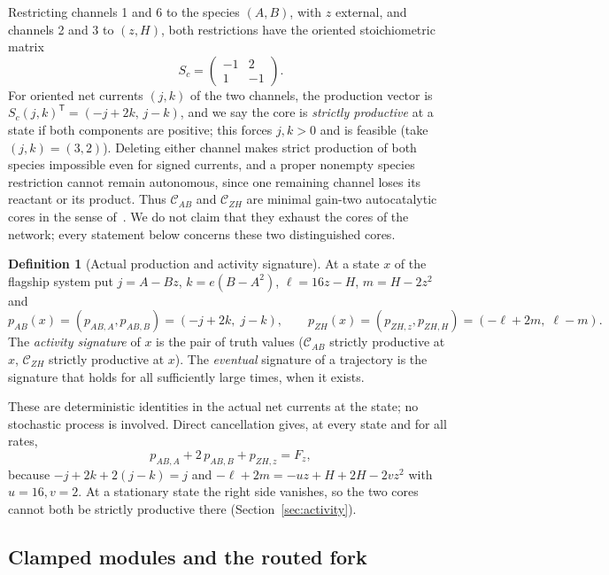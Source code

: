 \documentclass[11pt,a4paper]{article}
\theoremstyle{plain}
\theoremstyle{definition}
\newtheorem{definition}[theorem]{Definition}
\theoremstyle{remark}
\newcommand{\cAB}{\mathcal{C}_{AB}}
\newcommand{\cZH}{\mathcal{C}_{ZH}}
\begin{document}
Restricting channels 1 and 6 to the species $(A,B)$, with $z$ external, and channels 2 and 3 to $(z,H)$, both restrictions have the oriented stoichiometric matrix
\[
S_c=\begin{pmatrix}-1&2\\1&-1\end{pmatrix}.
\]
For oriented net currents $(j,k)$ of the two channels, the production vector is $S_c(j,k)^{\mathsf T}=(-j+2k,\,j-k)$, and we say the core is \emph{strictly productive} at a state if both components are positive; this forces $j,k>0$ and is feasible (take $(j,k)=(3,2)$). Deleting either channel makes strict production of both species impossible even for signed currents, and a proper nonempty species restriction cannot remain autonomous, since one remaining channel loses its reactant or its product. Thus $\cAB$ and $\cZH$ are minimal gain-two autocatalytic cores in the sense of~\cite{blokhuis2020,nandan2026}. We do not claim that they exhaust the cores of the network; every statement below concerns these two distinguished cores.

\begin{definition}[Actual production and activity signature]\label{def:activity}
At a state $x$ of the flagship system put $j=A-Bz$, $k=e(B-A^2)$, $\ell=16z-H$, $m=H-2z^2$ and
\begin{equation}\label{eq:production}
p_{AB}(x)=(p_{AB,A},p_{AB,B})=(-j+2k,\;j-k),\qquad
p_{ZH}(x)=(p_{ZH,z},p_{ZH,H})=(-\ell+2m,\;\ell-m).
\end{equation}
The \emph{activity signature} of $x$ is the pair of truth values ($\cAB$ strictly productive at $x$, $\cZH$ strictly productive at $x$). The \emph{eventual} signature of a trajectory is the signature that holds for all sufficiently large times, when it exists.
\end{definition}

These are deterministic identities in the actual net currents at the state; no stochastic process is involved. Direct cancellation gives, at every state and for all rates,
\begin{equation}\label{eq:balance-identity}
p_{AB,A}+2\,p_{AB,B}+p_{ZH,z}=F_z,
\end{equation}
because $-j+2k+2(j-k)=j$ and $-\ell+2m=-uz+H+2H-2vz^2$ with $u=16,v=2$. At a stationary state the right side vanishes, so the two cores cannot both be strictly productive there (Section~\ref{sec:activity}).

\subsection{Clamped modules and the routed fork}\label{sec:clamp}
\end{document}
